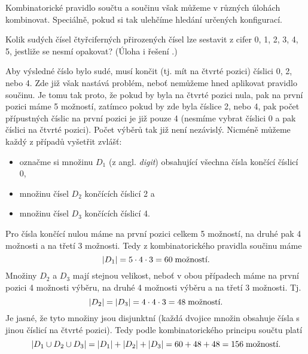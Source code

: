 Kombinatorické pravidlo součtu a součinu však můžeme v různých úlohách kombinovat. Speciálně, pokud si tak ulehčíme hledání určených konfigurací.

\begin{exercise}
    Kolik sudých čísel čtyřciferných přirozených čísel lze sestavit z cifer 0, 1, 2, 3, 4, 5, jestliže se nesmí opakovat? (Úloha i řešení \citep[str. 8]{Slavik2022}.)
\end{exercise}
\begin{solution}
    Aby výsledné číslo bylo sudé, musí končit (tj. mít na čtvrté pozici) číslici 0, 2, nebo 4. Zde již však nastává problém, neboť nemůžeme hned aplikovat pravidlo součinu. Je tomu tak proto, že pokud by byla na čtvrté pozici nula, pak na první pozici máme 5 možností, zatímco pokud by zde byla číslice 2, nebo 4, pak počet přípustných číslic na první pozici je již pouze 4 (nesmíme vybrat číslici 0 a pak číslici na čtvrté pozici). Počet výběrů tak již není nezávislý. Nicméně můžeme každý z případů vyšetřit zvlášť:
    \begin{itemize}
        \item označme si množinu $D_1$ (z angl. \emph{digit}) obsahující všechna čísla končící číslicí 0,
        \item množinu čísel $D_2$ končících číslicí 2 a
        \item množinu čísel $D_3$ končících číslicí 4.
    \end{itemize}
    Pro čísla končící nulou máme na první pozici celkem 5 možností, na druhé pak 4 možnosti a na třetí 3 možnosti. Tedy z kombinatorického pravidla součinu máme
    \begin{equation*}
        \left| D_1 \right|=5\cdot 4\cdot 3=60\;\text{možností.}
    \end{equation*}
    Množiny $D_2$ a $D_3$ mají stejnou velikost, neboť v obou případech máme na první pozici 4 možnosti výběru, na druhé 4 možnosti výběru a na třetí 3 možnosti. Tj.
    \begin{equation*}
        \left| D_2 \right|=\left| D_3 \right|=4\cdot 4\cdot 3=48\;\text{možností.}
    \end{equation*}
    Je jasné, že tyto množiny jsou disjunktní (každá dvojice množin obsahuje čísla s jinou číslicí na čtvrté pozici). Tedy podle kombinatorického principu součtu platí
    \begin{equation*}
        \left| D_1\cup D_2\cup D_3 \right|=\left| D_1 \right|+\left| D_2 \right|+\left| D_3 \right|=60+48+48=156\;\text{možností.}
    \end{equation*}
\end{solution}